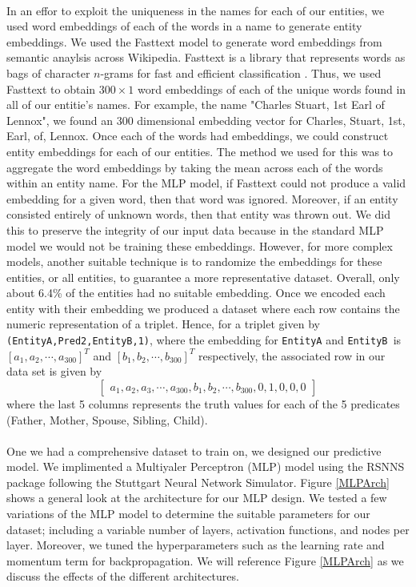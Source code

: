 \documentclass[11.5pt]{article}
\newcounter{Figure}
\newcommand{\Mat}[1]{\left[\begin{matrix} #1 \end{matrix}\right]}
\begin{document}
\paragraph{} In an effor to exploit the uniqueness in the names for each of our entities, we used word embeddings of each of the words in a name to generate entity embeddings. We used the Fasttext model to generate word embeddings from semantic anaylsis across Wikipedia. Fasttext is a library that represents words as bags of character $n$-grams for fast and efficient classification \cite{BojanowskiGJM16,JoulinGBM16}. Thus, we used Fasttext to obtain $300\times 1$ word embeddings of each of the unique words found in all of our entitie's names. For example, the name "Charles Stuart, 1st Earl of Lennox", we found an 300 dimensional embedding vector for Charles, Stuart, 1st, Earl, of, Lennox. Once each of the words had embeddings, we could construct entity embeddings for each of our entities. The method we used for this was to aggregate the word embeddings by taking the mean across each of the words within an entity name. For the MLP model, if Fasttext could not produce a valid embedding for a given word, then that word was ignored. Moreover, if an entity consisted entirely of unknown words, then that entity was thrown out. We did this to preserve the integrity of our input data because in the standard MLP model we would not be training these embeddings. However, for more complex models, another suitable technique is to randomize the embeddings for these entities, or all entities, to guarantee a more representative dataset. Overall, only about 6.4\% of the entities had no suitable embedding. Once we encoded each entity with their embedding we produced a dataset where each row contains the numeric representation of a triplet. Hence, for a triplet given by \texttt{(EntityA,Pred2,EntityB,1)}, where the embedding for \texttt{EntityA} and \texttt{EntityB }is $[a_1,a_2,\cdots,a_{300}]^T$ and $[b_1,b_2,\cdots,b_{300}]^T$ respectively, the associated row in our data set is given by
$$ \Mat{a_1,a_2,a_3,\cdots,a_{300},b_1,b_2,\cdots,b_{300},0,1,0,0,0} $$
where the last 5 columns represents the truth values for each of the 5 predicates (Father, Mother, Spouse, Sibling, Child).

\paragraph{} One we had a comprehensive dataset to train on, we designed our predictive model. We implimented a Multiyaler Perceptron (MLP) model using the RSNNS package following the Stuttgart Neural Network Simulator\cite{RSNNS}. Figure \ref{MLPArch} shows a general look at the architecture for our MLP design. We tested a few variations of the MLP model to determine the suitable parameters for our dataset; including a variable number of layers, activation functions, and nodes per layer. Moreover, we tuned the hyperparameters such as the learning rate and momentum term for backpropagation. We will reference Figure \ref{MLPArch} as we discuss the effects of the different architectures. 
\end{document}
